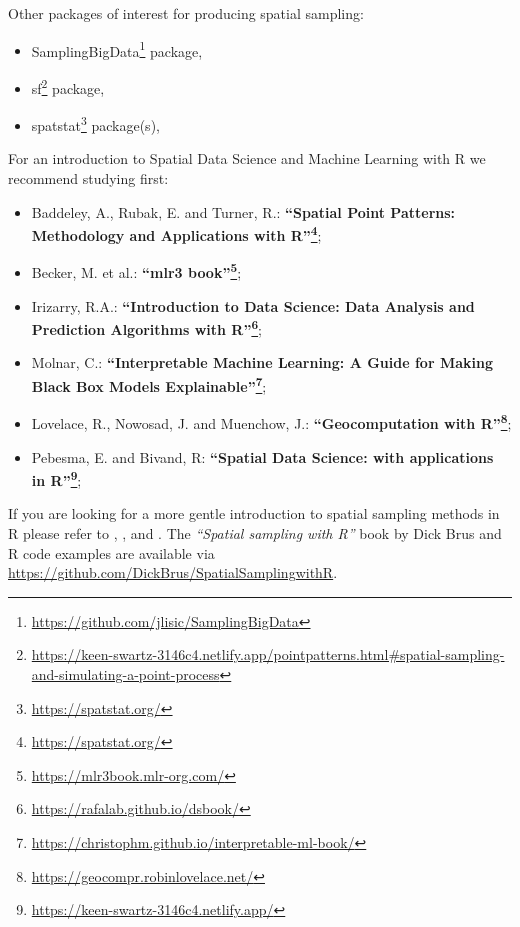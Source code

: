 \documentclass[
  graybox,natbib,nospthms]{svmono}
\providecommand{\tightlist}{%
  \setlength{\itemsep}{0pt}\setlength{\parskip}{0pt}}
\providecommand{\tightlist}{\setlength{\itemsep}{0pt}\setlength{\parskip}{0pt}}
\renewcommand{\href}[2]{#2 (\url{#1})}
\renewcommand{\href}[2]{#2\footnote{\url{#1}}}
\begin{document}
Other packages of interest for producing spatial sampling:

\begin{itemize}
\tightlist
\item
  \href{https://github.com/jlisic/SamplingBigData}{SamplingBigData} package,
\item
  \href{https://keen-swartz-3146c4.netlify.app/pointpatterns.html\#spatial-sampling-and-simulating-a-point-process}{sf} package,
\item
  \href{https://spatstat.org/}{spatstat} package(s),
\end{itemize}

For an introduction to Spatial Data Science and Machine Learning with R we recommend studying first:

\begin{itemize}
\tightlist
\item
  Baddeley, A., Rubak, E. and Turner, R.: \textbf{\href{https://spatstat.org/}{``Spatial Point Patterns: Methodology and Applications with R''}};\\
\item
  Becker, M. et al.: \textbf{\href{https://mlr3book.mlr-org.com/}{``mlr3 book''}};\\
\item
  Irizarry, R.A.: \textbf{\href{https://rafalab.github.io/dsbook/}{``Introduction to Data Science: Data Analysis and Prediction Algorithms with R''}};\\
\item
  Molnar, C.: \textbf{\href{https://christophm.github.io/interpretable-ml-book/}{``Interpretable Machine Learning: A Guide for Making Black Box Models Explainable''}};\\
\item
  Lovelace, R., Nowosad, J. and Muenchow, J.: \textbf{\href{https://geocompr.robinlovelace.net/}{``Geocomputation with R''}};\\
\item
  Pebesma, E. and Bivand, R: \textbf{\href{https://keen-swartz-3146c4.netlify.app/}{``Spatial Data Science: with applications in R''}};
\end{itemize}

If you are looking for a more gentle introduction to spatial sampling methods in R
please refer to \citet{Bivand2013Springer}, \citet{baddeley2015spatial}, \citet{BRUS2019464} and \citet{Brus2021sampling}.
The \emph{``Spatial sampling with R''} book by Dick Brus and R code examples are
available via \url{https://github.com/DickBrus/SpatialSamplingwithR}.
\end{document}
